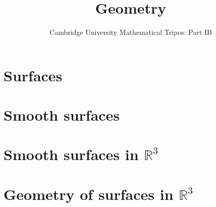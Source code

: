 \documentclass{article}
\title{Geometry}
\author{Cambridge University Mathematical Tripos: Part IB}
\begin{document}
\maketitle

\tableofcontentsnewpage{}

\section{Surfaces}

\section{Smooth surfaces}

\section{Smooth surfaces in \( \mathbb R^3 \)}

\section{Geometry of surfaces in \( \mathbb R^3 \)}

\end{document}
